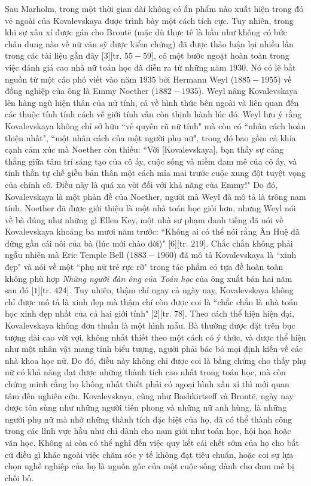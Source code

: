 \begin{multicols}{2}
	Sau Marholm, trong một thời gian dài không có ấn phẩm nào xuất hiện trong đó vẻ ngoài của Kovalevskaya được trình bày một cách tích cực. Tuy nhiên, trong khi sự xấu xí được gán cho Brontë (mặc dù thực tế là hầu như không có bức chân dung nào về nữ văn sỹ được kiểm chứng) đã được thảo luận lại nhiều lần trong các tài liệu gần đây [$3$][tr. $55-59$],  có một bước ngoặt hoàn toàn trong việc đánh giá cao nhà nữ toán học đã diễn ra từ những năm $1930$. Nó có lẽ bắt nguồn từ một cáo phó viết vào năm $1935$ bởi Hermann Weyl ($1885-1955$) về đồng nghiệp của ông là Emmy Noether ($1882-1935$). Weyl nâng Kovalevskaya lên hàng ngũ hiện thân của nữ tính, cả về hình thức bên ngoài và liên quan đến các thuộc tính tính cách về giới tính vẫn còn thịnh hành lúc đó. Weyl lưu ý rằng Kovalevskaya không chỉ sở hữu ``vẻ quyến rũ nữ tính" mà còn có ``nhân cách hoàn thiện nhất", ``một nhân cách của một người phụ nữ", trong đó bao gồm cả khía cạnh  cảm xúc mà Noether còn thiếu: ``Với [Kovalevskaya], bạn thấy sự căng thẳng giữa tâm trí sáng tạo của cô ấy, cuộc sống và niềm đam mê của cô ấy, và tinh thần tự chế giễu bản thân một cách mỉa mai trước cuộc xung đột tuyệt vọng của chính cô. Điều này là quá xa vời đối với khả năng của Emmy!" Do đó, Kovalevskaya là một phản đề của Noether, người mà Weyl đã mô tả là trông nam tính. Noether đã được giới thiệu là một nhà toán học giỏi hơn, nhưng Weyl nói về bà đúng như những gì Ellen Key, một nhà sư phạm danh tiếng đã nói về Kovalevskaya khoảng ba mươi năm trước: ``Không ai có thể nói rằng Ân Huệ đã đứng gần cái nôi của bà (lúc mới chào đời)" [$6$][tr. $219$]. Chắc chắn không phải ngẫu nhiên mà Eric Temple Bell ($1883-1960$) đã mô tả Kovalevskaya là ``xinh đẹp" và nói về một ``phụ nữ trẻ rực rỡ" trong tác phẩm có tựa đề hoàn toàn không phù hợp \textit{Những người đàn ông của Toán học} của ông xuất bản hai năm sau đó [$1$][tr. $424$]. Tuy nhiên, thậm chí ngay cả ngày nay, Kovalevskaya không chỉ được mô tả là xinh đẹp mà thậm chí còn được coi là ``chắc chắn là nhà toán học xinh đẹp nhất của cả hai giới tính" [$2$][tr. $78$].
	\vskip 0.1cm
	Theo cách thể hiện hiện đại, Kovalevskaya không đơn thuần là một hình mẫu. Bà thường được đặt trên bục tượng đài cao vời vợi, không nhất thiết theo một cách có ý thức, và được thể hiện như một nhân vật mang tính biểu tượng, người phải bác bỏ mọi định kiến về các nhà khoa học nữ. Do đó, điều này không chỉ được coi là bằng chứng cho thấy phụ nữ có khả năng đạt được những thành tích cao nhất trong toán học, mà còn chứng minh rằng họ không nhất thiết phải có ngoại hình xấu xí thì mới quan tâm đến nghiên cứu. Kovalevskaya, cũng như Bashkirtseff và Brontë, ngày nay được tôn sùng như những người tiên phong và những nữ anh hùng, là những người phụ nữ mà nhờ những thành tích đặc biệt của họ, đã có thể thành công trong các lĩnh vực hầu như chỉ dành cho nam giới như toán học, hội họa hoặc văn học. Không ai còn có thể nghĩ đến việc quy kết cái chết sớm của họ cho bất cứ điều gì khác ngoài việc chăm sóc y tế không đạt tiêu chuẩn, hoặc coi sự lựa chọn nghề nghiệp của họ là nguồn gốc của một cuộc sống dành cho đam mê bị chối bỏ.

\end{multicols}
